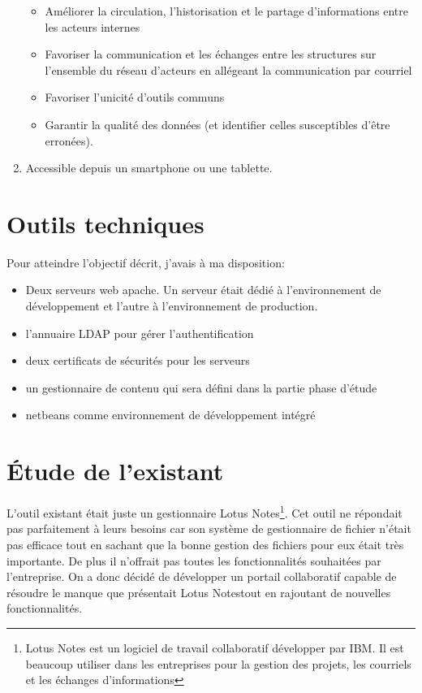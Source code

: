 \begin{enumerate}
\begin{itemize}
\item Améliorer la circulation, l'historisation et le partage d'informations entre les acteurs internes
\item Favoriser la communication et les échanges entre les structures sur l'ensemble du réseau
d'acteurs en allégeant la communication par courriel
\item Favoriser l'unicité d'outils communs
\item Garantir la qualité des données (et identifier celles susceptibles d'être erronées).
\end{itemize}
\item Accessible depuis un smartphone ou une tablette.
\end{enumerate}
\section{Outils techniques}
Pour atteindre l'objectif décrit, j'avais à ma disposition: 
\begin{itemize}
\item Deux serveurs web apache. Un serveur était dédié à l'environnement de développement et l'autre à l'environnement de production.
\item l'annuaire LDAP pour gérer l'authentification
\item deux certificats de sécurités pour les serveurs 
\item un gestionnaire de contenu qui sera défini dans la partie \og phase d'étude\fg{}
\item netbeans comme environnement de développement intégré
\end{itemize}  
\section{Étude de l'existant}
L'outil existant était juste un gestionnaire Lotus Notes\footnote{Lotus Notes est un logiciel de travail collaboratif développer par IBM. Il est beaucoup utiliser dans les entreprises pour la gestion des projets, les courriels et les échanges d'informations}. Cet outil ne répondait pas parfaitement à leurs besoins car son système de gestionnaire de fichier n'était pas efficace tout en sachant que la bonne gestion des fichiers pour eux était très importante. De plus il n'offrait pas toutes les fonctionnalités souhaitées par l'entreprise.
On a donc décidé de développer un portail collaboratif capable de résoudre le manque que présentait Lotus Notestout en rajoutant de nouvelles fonctionnalités.